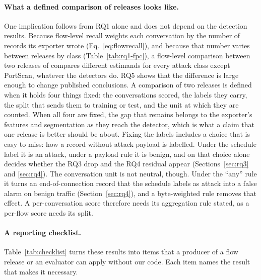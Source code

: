\paragraph{What a defined comparison of releases looks like.} One implication follows from RQ1 alone and does not depend on the detection results. Because flow-level recall weights each conversation by the number of records its exporter wrote (Eq.~\eqref{eq:flowrecall}), and because that number varies between releases by class (Table~\ref{tab:rq1-fpc}), a flow-level comparison between two releases of \cicids{} compares different estimands for every attack class except PortScan, whatever the detectors do. RQ5 shows that the difference is large enough to change published conclusions. A comparison of two releases is defined when it holds four things fixed: the conversations scored, the labels they carry, the split that sends them to training or test, and the unit at which they are counted. When all four are fixed, the gap that remains belongs to the exporter's features and segmentation as they reach the detector, which is what a claim that one release is better should be about. Fixing the labels includes a choice that is easy to miss: how a record without attack payload is labelled. Under the schedule label it is an attack, under a payload rule it is benign, and on \cicids{} that choice alone decides whether the RQ3 drop and the RQ4 residual appear (Sections~\ref{sec:rq3} and \ref{sec:rq4}). The conversation unit is not neutral, though. Under the ``any'' rule it turns an end-of-connection record that the schedule labels as attack into a false alarm on benign traffic (Section~\ref{sec:rq4}), and a byte-weighted rule removes that effect. A per-conversation score therefore needs its aggregation rule stated, as a per-flow score needs its split.

\paragraph{A reporting checklist.} Table~\ref{tab:checklist} turns these results into items that a producer of a flow release or an evaluator can apply without our code. Each item names the result that makes it necessary.

